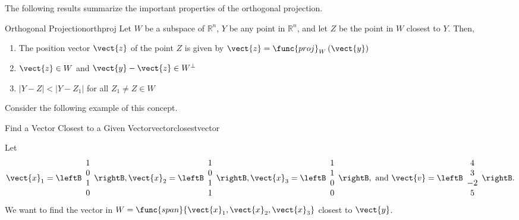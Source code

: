The following results summarize the important properties of the orthogonal projection. 

\begin{theorem}{Orthogonal Projection}{orthproj}
Let $W$ be a subspace of $\mathbb{R}^n$, $Y$ be any point in $\mathbb{R}^n$, and let $Z$ be the point in $W$ closest to $Y$. Then, 
\begin{enumerate}
\item 
The position vector $\vect{z}$ of the point $Z$ is given by $\vect{z} = \func{proj}_{W}\left( \vect{y}\right)$
\item
$\vect{z} \in W$ and $\vect{y} - \vect{z} \in W^{\perp}$
\item
$| Y - Z | < | Y - Z_1 |$ for all $Z_1 \neq Z \in W$
\end{enumerate}
\end{theorem}

Consider the following example of this concept.

\begin{example}{Find a Vector Closest to a Given Vector}{vectorclosestvector}

Let
\[ \vect{x}_1=\leftB\begin{array}{c} 1\\ 0\\ 1\\ 0 \end{array}\rightB,
\vect{x}_2=\leftB\begin{array}{c} 1\\ 0\\ 1\\ 1 \end{array}\rightB,
\vect{x}_3=\leftB\begin{array}{c} 1\\ 1\\ 0\\ 0 \end{array}\rightB,
\mbox{ and }
\vect{v}=\leftB\begin{array}{c} 4\\ 3\\ -2\\ 5 \end{array}\rightB. \]
We want to find the vector in
$W =\func{span}\{\vect{x}_1, \vect{x}_2,\vect{x}_3\}$
closest to $\vect{y}$.
\end{example}

